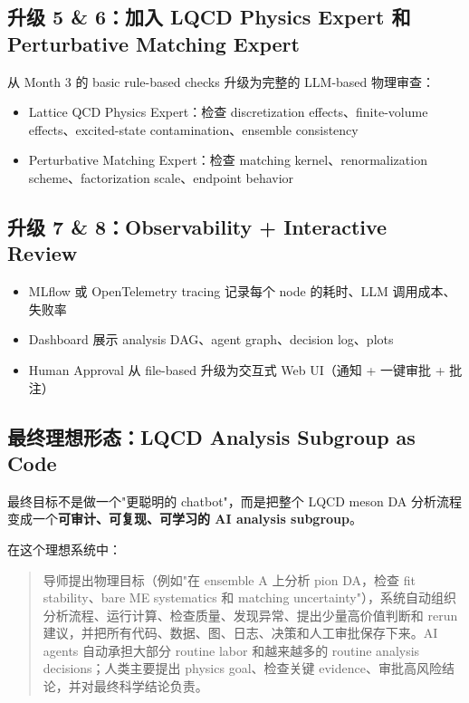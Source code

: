 \documentclass[11pt,a4paper,fontset=fandol]{ctexart}
\begin{document}
\subsection{升级 5 \& 6：加入 LQCD Physics Expert 和 Perturbative Matching Expert}

从 Month 3 的 basic rule-based checks 升级为完整的 LLM-based 物理审查：
\begin{itemize}
  \item Lattice QCD Physics Expert：检查 discretization effects、finite-volume effects、excited-state contamination、ensemble consistency
  \item Perturbative Matching Expert：检查 matching kernel、renormalization scheme、factorization scale、endpoint behavior
\end{itemize}

\subsection{升级 7 \& 8：Observability + Interactive Review}

\begin{itemize}
  \item MLflow 或 OpenTelemetry tracing 记录每个 node 的耗时、LLM 调用成本、失败率
  \item Dashboard 展示 analysis DAG、agent graph、decision log、plots
  \item Human Approval 从 file-based 升级为交互式 Web UI（通知 + 一键审批 + 批注）
\end{itemize}

\subsection{最终理想形态：LQCD Analysis Subgroup as Code}

最终目标不是做一个"更聪明的 chatbot"，而是把整个 LQCD meson DA 分析流程变成一个\textbf{可审计、可复现、可学习的 AI analysis subgroup}。

在这个理想系统中：
\begin{quote}
导师提出物理目标（例如"在 ensemble A 上分析 pion DA，检查 fit stability、bare ME systematics 和 matching uncertainty"），系统自动组织分析流程、运行计算、检查质量、发现异常、提出少量高价值判断和 rerun 建议，并把所有代码、数据、图、日志、决策和人工审批保存下来。AI agents 自动承担大部分 routine labor 和越来越多的 routine analysis decisions；人类主要提出 physics goal、检查关键 evidence、审批高风险结论，并对最终科学结论负责。
\end{quote}
\end{document}
